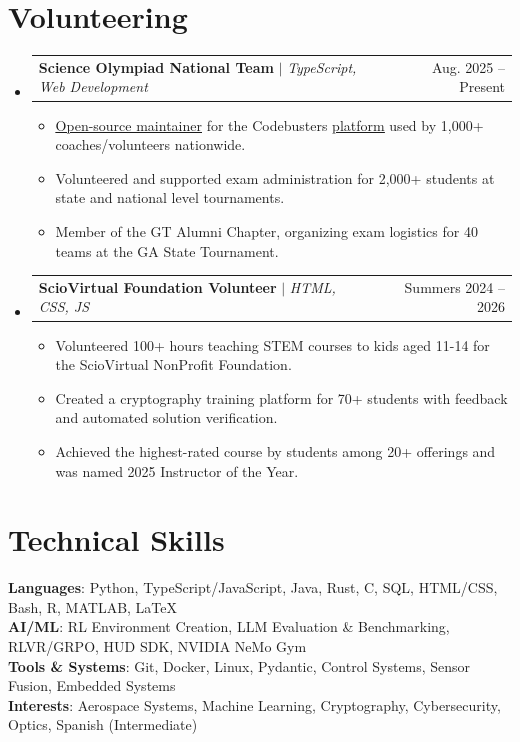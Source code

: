 \documentclass[letterpaper,11pt]{article}
\makeatletter
\newcommand{\resumeItem}[1]{
  \item[--]\small{
    {#1 \vspace{-2pt}}
  }
}
\newcommand{\resumeProjectHeading}[2]{
    \item
    \begin{tabular*}{0.97\textwidth}{l@{\extracolsep{\fill}}r}
      \small#1 & #2 \\
    \end{tabular*}\vspace{-7pt}
}
\newcommand{\resumeSubHeadingListStart}{\begin{itemize}[leftmargin=0.15in, label={}]}
\newcommand{\resumeSubHeadingListEnd}{\end{itemize}}
\newcommand{\resumeItemListStart}{\begin{itemize}}
\newcommand{\resumeItemListEnd}{\end{itemize}\vspace{-5pt}}
\makeatother
\begin{document}
\section{Volunteering}
    \resumeSubHeadingListStart
      \resumeProjectHeading
          {\textbf{Science Olympiad National Team} $|$ \emph{TypeScript, Web Development}}{Aug. 2025 -- Present}
          \resumeItemListStart
            \resumeItem{\href{https://github.com/toebes/ciphers}{\underline{Open-source maintainer}} for the Codebusters \href{https://toebes.com/codebusters/}{\underline{platform}} used by 1,000+ coaches/volunteers nationwide.}
            \resumeItem{Volunteered and supported exam administration for 2,000+ students at state and national level tournaments.}
            \resumeItem{Member of the GT Alumni Chapter, organizing exam logistics for 40 teams at the GA State Tournament.}
          \resumeItemListEnd
      \resumeProjectHeading{\textbf{ScioVirtual Foundation Volunteer} $|$ \emph{HTML, CSS, JS}}{Summers 2024 -- 2026}
      \resumeItemListStart
        \resumeItem{Volunteered 100+ hours teaching STEM courses to kids aged 11-14 for the ScioVirtual NonProfit Foundation.}
        \resumeItem{Created a cryptography training platform for 70+ students with feedback and automated solution verification.}
        \resumeItem{Achieved the highest-rated course by students among 20+ offerings and was named 2025 Instructor of the Year.}
\resumeItemListEnd
\resumeSubHeadingListEnd
%
\section{Technical Skills}
 \begin{itemize}[leftmargin=0.15in, label={}]
    \small{\item{
     \textbf{Languages}{: Python, TypeScript/JavaScript, Java, Rust, C, SQL, HTML/CSS, Bash, R, MATLAB, \LaTeX} \\
     \textbf{AI/ML}{: RL Environment Creation, LLM Evaluation \& Benchmarking, RLVR/GRPO, HUD SDK, NVIDIA NeMo Gym} \\
     \textbf{Tools \& Systems}{: Git, Docker, Linux, Pydantic, Control Systems, Sensor Fusion, Embedded Systems} \\
     \textbf{Interests}{: Aerospace Systems, Machine Learning, Cryptography, Cybersecurity, Optics, Spanish (Intermediate)}
    }}
 \end{itemize}


\end{document}
